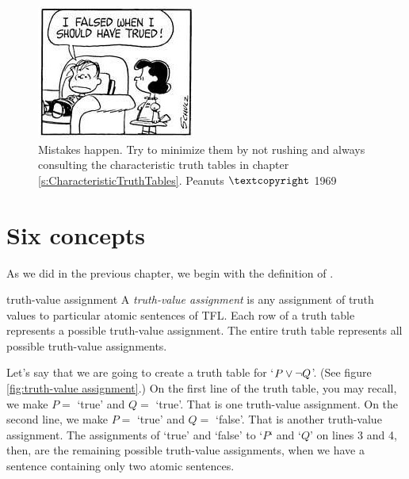 \begin{figure} %
\includegraphics[width=.25\textwidth]{i_falsed-2.jpg}
\caption{Mistakes happen. Try to minimize them by not rushing and always consulting the characteristic truth tables in chapter \ref{s:CharacteristicTruthTables}. \tiny{Peanuts $\textcopyright$ 1969}}
\label{fig:falsed}
\end{figure}





\chapter{Six concepts}
\label{s:SemanticConcepts}

As we did in the previous chapter, we begin with the definition of .

\begin{factboxy}{truth-value assignment}
A \textit{truth-value assignment} is any assignment of truth values to particular atomic sentences of TFL. Each row of a truth table represents a possible truth-value assignment. The entire truth table represents all possible truth-value assignments.
\end{factboxy}

Let's say that we are going to create a truth table for `$P \vee {\neg} Q$'. (See figure \ref{fig:truth-value assignment}.) On the first line of the truth table, you may recall, we make $P =$ `true' and $Q =$ `true'. That is one truth-value assignment. On the second line, we make $P =$ `true' and $Q =$ `false'. That is another truth-value assignment. The assignments of `true' and `false' to `$P$` and `$Q$' on lines 3 and 4, then, are the remaining possible truth-value assignments, when we have a sentence containing only two atomic sentences.



